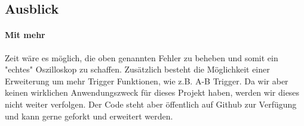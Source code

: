 \documentclass{article}
\begin{document}
\subsection{Ausblick}
\paragraph{Mit mehr}
Zeit wäre es möglich, die oben genannten Fehler zu beheben und somit ein "echtes" Oszilloskop zu schaffen. Zusätzlich besteht die Möglichkeit einer Erweiterung um mehr Trigger Funktionen, wie z.B. A-B Trigger. Da wir aber keinen wirklichen Anwendungszweck für dieses Projekt haben, werden wir dieses nicht weiter verfolgen. Der Code steht aber öffentlich auf Github zur Verfügung und kann gerne geforkt und erweitert werden.
\newpage

\printbibliography[heading=bibintoc,title={Literaturverzeichnis}]
\listoffigures
\end{document}
